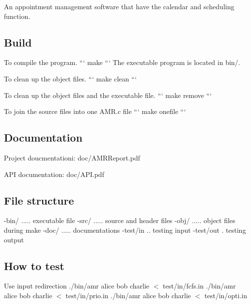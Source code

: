 An appointment management software that have the calendar and scheduling function.

\subsection*{Build }

To compile the program. ``` make ``` The executable program is located in bin/.

To clean up the object files. ``` make clean ```

To clean up the object files and the executable file. ``` make remove ```

To join the source files into one A\+M\+R.\+c file ``` make onefile ```

\subsection*{Documentation }

Project doucmentationi\+: doc/\+A\+M\+R\+Report.\+pdf

A\+P\+I documentation\+: doc/\+A\+P\+I.\+pdf

\subsection*{File structure }

-\/bin/ ..... executable file -\/src/ ..... source and header files -\/obj/ ..... object files during make -\/doc/ ..... documentations -\/test/in .. testing input -\/test/out . testing output

\subsection*{How to test }

Use input redirection ./bin/amr alice bob charlie $<$ test/in/fcfs.\+in ./bin/amr alice bob charlie $<$ test/in/prio.\+in ./bin/amr alice bob charlie $<$ test/in/opti.\+in 
